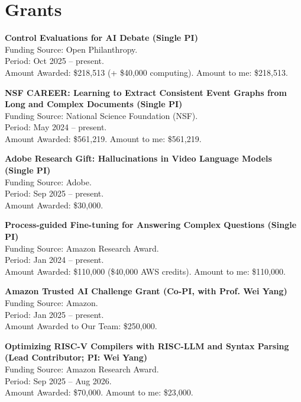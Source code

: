 \section{Grants}

\noindent \textbf{Control Evaluations for AI Debate (Single PI)} \\
\indent Funding Source: Open Philanthropy. \\
\indent Period: Oct 2025 -- present. \\
\indent Amount Awarded: \$218,513 (+ \$40,000 computing). Amount to me: \$218,513.

\noindent \textbf{NSF CAREER: Learning to Extract Consistent Event Graphs from Long and Complex Documents (Single PI)} \\
\indent Funding Source: National Science Foundation (NSF). \\
\indent Period: May 2024 -- present. \\
\indent Amount Awarded: \$561,219. Amount to me: \$561,219. \\
\indent {\textbf{\textcolor{blue}{Awarded on first submission.}}}

\noindent \textbf{Adobe Research Gift: Hallucinations in Video Language Models (Single PI)} \\
\indent Funding Source: Adobe. \\
\indent Period: Sep 2025 -- present. \\
\indent Amount Awarded: \$30,000.

\noindent \textbf{Process-guided Fine-tuning for Answering Complex Questions (Single PI)} \\
\indent Funding Source: Amazon Research Award. \\
\indent Period: Jan 2024 -- present. \\
\indent Amount Awarded: \$110,000 (\$40,000 AWS credits). Amount to me: \$110,000.

\noindent \textbf{Amazon Trusted AI Challenge Grant (Co-PI, with Prof. Wei Yang)} \\
\indent Funding Source: Amazon. \\
\indent Period: Jan 2025 -- present. \\
\indent Amount Awarded to Our Team: \$250,000.

\noindent \textbf{Optimizing RISC-V Compilers with RISC-LLM and Syntax Parsing (Lead Contributor; PI: Wei Yang)} \\
\indent Funding Source: Amazon Research Award. \\
\indent Period: Sep 2025 -- Aug 2026. \\
\indent Amount Awarded: \$70,000. Amount to me: \$23,000.

